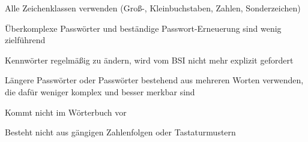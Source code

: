 \item Alle Zeichenklassen verwenden (Groß-, Kleinbuchstaben, Zahlen, Sonderzeichen)
\item Überkomplexe Passwörter und beständige Passwort-Erneuerung sind wenig zielführend
\item Kennwörter regelmäßig zu ändern, wird vom BSI nicht mehr explizit gefordert
\item Längere Passwörter oder Passwörter bestehend aus mehreren Worten verwenden, die dafür weniger komplex und besser merkbar sind
\item Kommt nicht im Wörterbuch vor
\item Besteht nicht aus gängigen Zahlenfolgen oder Tastaturmustern